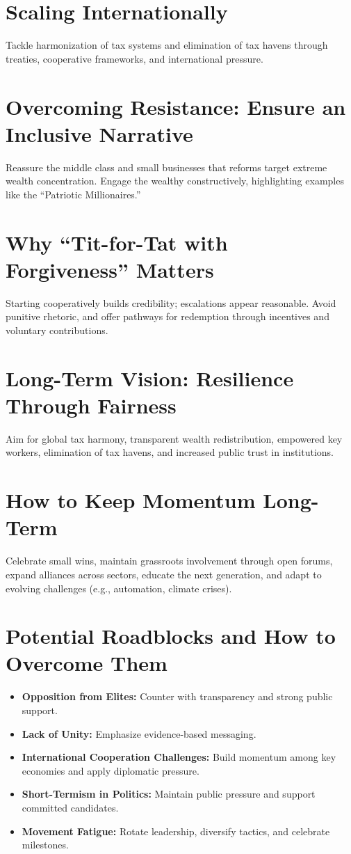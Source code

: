 \documentclass[11pt,a4paper]{article}
\begin{document}
\section{Scaling Internationally}
Tackle harmonization of tax systems and elimination of tax havens through treaties, cooperative frameworks, and international pressure.

\section{Overcoming Resistance: Ensure an Inclusive Narrative}
Reassure the middle class and small businesses that reforms target extreme wealth concentration. Engage the wealthy constructively, highlighting examples like the ``Patriotic Millionaires.''

\section{Why ``Tit-for-Tat with Forgiveness'' Matters}
Starting cooperatively builds credibility; escalations appear reasonable. Avoid punitive rhetoric, and offer pathways for redemption through incentives and voluntary contributions.

\section{Long-Term Vision: Resilience Through Fairness}
Aim for global tax harmony, transparent wealth redistribution, empowered key workers, elimination of tax havens, and increased public trust in institutions.

\section{How to Keep Momentum Long-Term}
Celebrate small wins, maintain grassroots involvement through open forums, expand alliances across sectors, educate the next generation, and adapt to evolving challenges (e.g., automation, climate crises).

\section{Potential Roadblocks and How to Overcome Them}
\begin{itemize}
  \item \textbf{Opposition from Elites:} Counter with transparency and strong public support.
  \item \textbf{Lack of Unity:} Emphasize evidence-based messaging.
  \item \textbf{International Cooperation Challenges:} Build momentum among key economies and apply diplomatic pressure.
  \item \textbf{Short-Termism in Politics:} Maintain public pressure and support committed candidates.
  \item \textbf{Movement Fatigue:} Rotate leadership, diversify tactics, and celebrate milestones.
\end{itemize}
\end{document}
